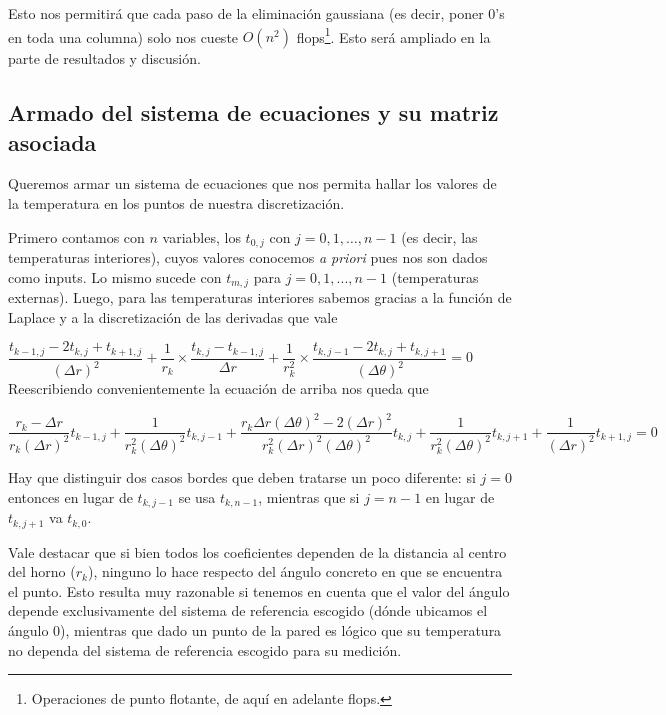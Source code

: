 Esto nos permitirá que cada paso de la eliminación gaussiana (es decir, poner 0's en toda una columna) solo nos cueste $O(n^2)$ flops\footnote{Operaciones de punto flotante, de aquí en adelante flops.}. Esto será ampliado en la parte de resultados y discusión.

  
\subsection{Armado del sistema de ecuaciones y su matriz asociada}
\label{sec:armado-sistema}
Queremos armar un sistema de ecuaciones que nos permita hallar los valores de la temperatura en los puntos de nuestra discretización.

Primero contamos con $n$ variables, los $t_{0,j}$ con $j = 0,1,\hdots, n-1$ (es decir, las temperaturas interiores), cuyos valores conocemos \textit{a priori} pues nos son dados como inputs. Lo mismo sucede con $t_{m, j}$ para \mbox{$j = 0,1,..., n-1$} (temperaturas externas).
Luego, para las temperaturas interiores sabemos gracias a la función de Laplace y a la discretización de las derivadas que vale 

$\dfrac{t_{k-1,j} - 2t_{k,j} + t_{k+1,j}}{(\Delta r)^2} 
+ \dfrac{1}{r_k} \times \dfrac{t_{k,j} - t_{k-1,j}}{\Delta r}
+ \dfrac{1}{r_{k}^2} \times \dfrac{t_{k,j-1} -2t_{k,j} + t_{k,j+1}}{(\Delta \theta)^2} = 0$\\

Reescribiendo convenientemente la ecuación de arriba nos queda que 

\begin{equation}
\label{eq:laplace-discreto}
\dfrac{r_k - \Delta r}{r_k (\Delta r)^2} t_{k-1, j} +
\dfrac{1}{r_k^2(\Delta \theta)^2} t_{k, j-1} +
\dfrac{r_k \Delta r (\Delta \theta)^2 - 2(\Delta r)^2}{r_k^2 (\Delta r)^2 (\Delta \theta)^2} t_{k,j} +
\dfrac{1}{r_k^2(\Delta \theta)^2} t_{k, j+1} +
\dfrac{1}{(\Delta r)^2} t_{k+1,j}  = 0
\end{equation}

Hay que distinguir dos casos bordes que deben tratarse un poco diferente: si $j = 0$ entonces en lugar de $t_{k, j-1}$ se usa $t_{k, n-1}$, mientras que si $j = n-1$ en lugar de $t_{k, j+1}$ va $t_{k, 0}$.

Vale destacar que si bien todos los coeficientes dependen de la distancia al centro del horno ($r_k$), ninguno lo hace respecto del ángulo concreto en que se encuentra el punto. Esto resulta muy razonable si tenemos en cuenta que el valor del ángulo depende exclusivamente del sistema de referencia escogido (dónde ubicamos el ángulo 0), mientras que dado un punto de la pared es lógico que su temperatura no dependa del sistema de referencia escogido para su medición.

